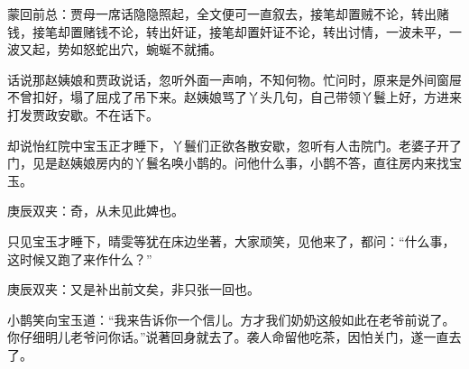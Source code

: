 

\begin{parag}
    \begin{note}蒙回前总：贾母一席话隐隐照起，全文便可一直叙去，接笔却置贼不论，转出赌钱，接笔却置赌钱不论，转出奸证，接笔却置奸证不论，转出讨情，一波未平，一波又起，势如怒蛇出穴，蜿蜒不就捕。\end{note}
\end{parag}


\begin{parag}
    话说那赵姨娘和贾政说话，忽听外面一声响，不知何物。忙问时，原来是外间窗屉不曾扣好，塌了屈戍了吊下来。赵姨娘骂了丫头几句，自己带领丫鬟上好，方进来打发贾政安歇。不在话下。
\end{parag}


\begin{parag}
    却说怡红院中宝玉正才睡下，丫鬟们正欲各散安歇，忽听有人击院门。老婆子开了门，见是赵姨娘房内的丫鬟名唤小鹊的。问他什么事，小鹊不答，直往房内来找宝玉。\begin{note}庚辰双夹：奇，从未见此婢也。\end{note}只见宝玉才睡下，晴雯等犹在床边坐著，大家顽笑，见他来了，都问：“什么事，这时候又跑了来作什么？”\begin{note}庚辰双夹：又是补出前文矣，非只张一回也。\end{note}小鹊笑向宝玉道：“我来告诉你一个信儿。方才我们奶奶这般如此在老爷前说了。你仔细明儿老爷问你话。”说著回身就去了。袭人命留他吃茶，因怕关门，遂一直去了。
\end{parag}


